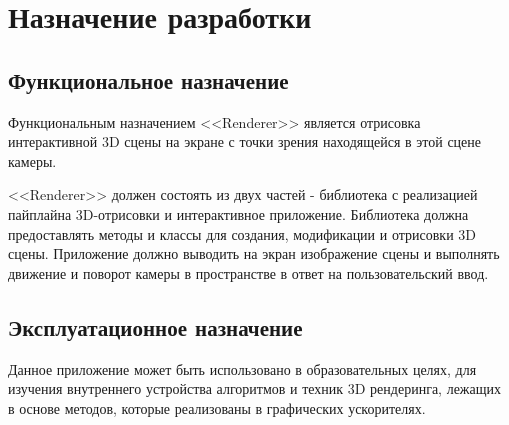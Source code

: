 \section{Назначение разработки}

\subsection{Функциональное назначение}

Функциональным назначением <<Renderer>> является отрисовка интерактивной 3D сцены на экране с точки зрения находящейся в этой сцене камеры.

<<Renderer>> должен состоять из двух частей - библиотека с реализацией пайплайна 3D-отрисовки и интерактивное приложение.
Библиотека должна предоставлять методы и классы для создания, модификации и отрисовки 3D сцены. 
Приложение должно выводить на экран изображение сцены и выполнять движение и поворот камеры в пространстве в ответ на пользовательский ввод.

\subsection{Эксплуатационное назначение}

Данное приложение может быть использовано в образовательных целях, для изучения внутреннего устройства алгоритмов и техник 3D рендеринга, лежащих в основе методов, которые реализованы в графических ускорителях.

